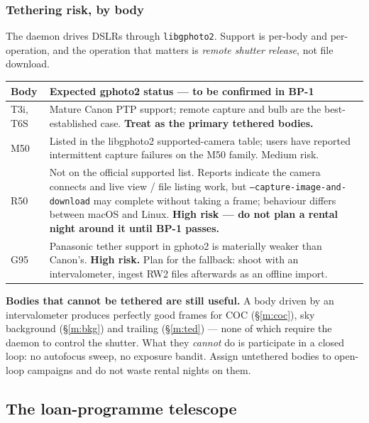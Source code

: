 \documentclass[11pt]{article}
\newcommand{\co}[1]{\texttt{\small #1}}
\begin{document}
\subsubsection*{Tethering risk, by body}

The daemon drives DSLRs through \co{libgphoto2}. Support is per-body and
per-operation, and the operation that matters is \emph{remote shutter release},
not file download.

\begin{center}
\small
\begin{tabular}{@{}lp{}@{}}
\toprule
\textbf{Body} & \textbf{Expected gphoto2 status --- to be confirmed in BP-1} \\
\midrule
T3i, T6S & Mature Canon PTP support; remote capture and bulb are the
           best-established case. \textbf{Treat as the primary tethered bodies.} \\
M50      & Listed in the libgphoto2 supported-camera table; users have reported
           intermittent capture failures on the M50 family. Medium risk. \\
R50      & Not on the official supported list. Reports indicate the camera
           connects and live view / file listing work, but
           \co{--capture-image-and-download} may complete without taking a
           frame; behaviour differs between macOS and Linux. \textbf{High risk
           --- do not plan a rental night around it until BP-1 passes.} \\
G95      & Panasonic tether support in gphoto2 is materially weaker than
           Canon's. \textbf{High risk.} Plan for the fallback: shoot with an
           intervalometer, ingest RW2 files afterwards as an offline import. \\
\bottomrule
\end{tabular}
\end{center}

\begin{keybox}
\textbf{Bodies that cannot be tethered are still useful.} A body driven by an
intervalometer produces perfectly good frames for COC (\S\ref{m:coc}), sky background
(\S\ref{m:bkg}) and trailing (\S\ref{m:ted}) --- none of which require the daemon to control the
shutter. What they \emph{cannot} do is participate in a closed loop: no
autofocus sweep, no exposure bandit. Assign untethered bodies to open-loop
campaigns and do not waste rental nights on them.
\end{keybox}

\subsection{The loan-programme telescope}\label{sec:loaner}
\end{document}
